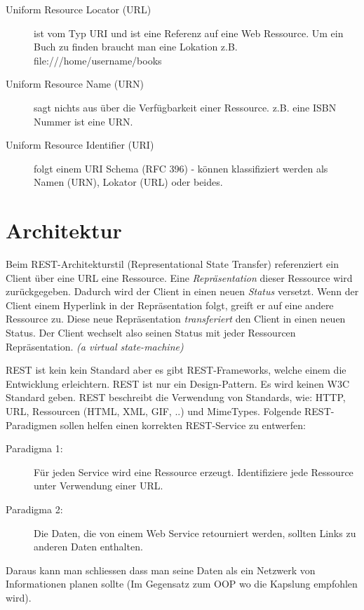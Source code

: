 \begin{description}
	\item[Uniform Resource Locator (URL)] ist vom Typ URI und ist eine Referenz auf eine Web Ressource. Um ein Buch zu finden braucht man eine Lokation z.B. file:///home/username/books
	\item[Uniform Resource Name (URN)] sagt nichts aus über die Verfügbarkeit einer Ressource. z.B. eine ISBN Nummer ist eine URN.
	\item[Uniform Resource Identifier (URI)] folgt einem URI Schema (RFC 396) - können klassifiziert werden als Namen (URN), Lokator (URL) oder beides.
\end{description}

\section{Architektur}

Beim REST-Architekturstil (Representational State Transfer) referenziert ein Client über eine URL eine Ressource. Eine \textit{Repräsentation} dieser Ressource wird zurückgegeben. Dadurch wird der Client in einen neuen \textit{Status} versetzt. Wenn der Client einem Hyperlink in der Repräsentation folgt, greift er auf eine andere Ressource zu. Diese neue Repräsentation \textit{transferiert} den Client in einen neuen Status. Der Client wechselt also seinen Status mit jeder Ressourcen Repräsentation. \emph{(a virtual state-machine)}

REST ist kein kein Standard aber es gibt REST-Frameworks, welche einem die Entwicklung erleichtern. REST ist nur ein Design-Pattern. Es wird keinen W3C Standard geben. REST beschreibt die Verwendung von Standards, wie: HTTP, URL, Ressourcen (HTML, XML, GIF, ..) und MimeTypes. Folgende REST-Paradigmen sollen helfen einen korrekten REST-Service zu entwerfen:
\begin{description}
	\item[Paradigma 1:] Für jeden Service wird eine Ressource erzeugt. Identifiziere jede Ressource unter Verwendung einer URL.
	\item[Paradigma 2:] Die Daten, die von einem Web Service retourniert werden, sollten Links zu anderen Daten enthalten.
\end{description}
Daraus kann man schliessen dass man seine Daten als ein Netzwerk von Informationen planen sollte (Im Gegensatz zum OOP wo die Kapslung empfohlen wird).

